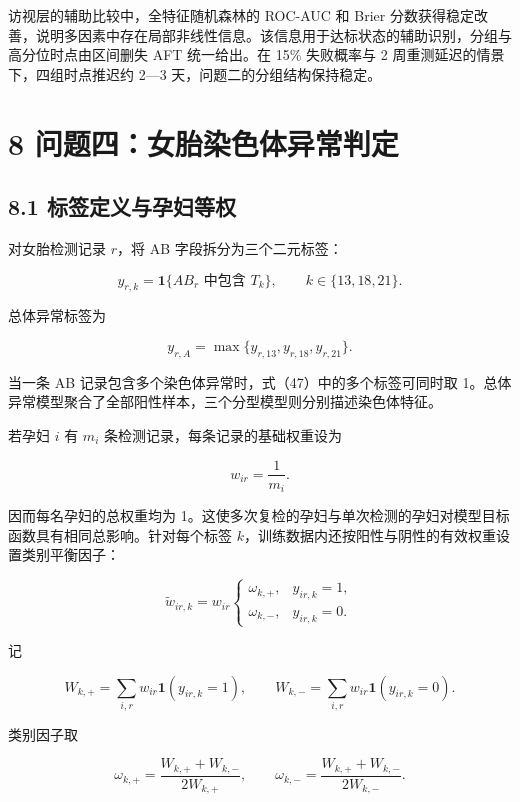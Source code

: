 \documentclass[UTF8,fontset=fandol,zihao=-4,a4paper]{ctexart}
\begin{document}
访视层的辅助比较中，全特征随机森林的 ROC-AUC 和 Brier
分数获得稳定改善，说明多因素中存在局部非线性信息。该信息用于达标状态的辅助识别，分组与高分位时点由区间删失
AFT 统一给出。在 15\% 失败概率与 2 周重测延迟的情景下，四组时点推迟约
2---3 天，问题二的分组结构保持稳定。

\FloatBarrier

\section{8
问题四：女胎染色体异常判定}\label{ux95eeux9898ux56dbux5973ux80ceux67d3ux8272ux4f53ux5f02ux5e38ux5224ux5b9a}

\subsection{8.1
标签定义与孕妇等权}\label{ux6807ux7b7eux5b9aux4e49ux4e0eux5b55ux5987ux7b49ux6743}

对女胎检测记录 \(r\)，将 AB 字段拆分为三个二元标签：

\[
y_{r,k}
=\mathbf1\{AB_r\text{ 中包含 }T_k\},
\qquad k\in\{13,18,21\}.
\tag{47}
\]

总体异常标签为

\[
y_{r,A}
=\max\{y_{r,13},y_{r,18},y_{r,21}\}.
\tag{48}
\]

当一条 AB 记录包含多个染色体异常时，式（47）中的多个标签可同时取
1。总体异常模型聚合了全部阳性样本，三个分型模型则分别描述染色体特征。

若孕妇 \(i\) 有 \(m_i\) 条检测记录，每条记录的基础权重设为

\[
w_{ir}=\frac{1}{m_i}.
\tag{49}
\]

因而每名孕妇的总权重均为
1。这使多次复检的孕妇与单次检测的孕妇对模型目标函数具有相同总影响。针对每个标签
\(k\)，训练数据内还按阳性与阴性的有效权重设置类别平衡因子：

\[
\widetilde w_{ir,k}
=w_{ir}
\begin{cases}
\omega_{k,+},&y_{ir,k}=1,\\
\omega_{k,-},&y_{ir,k}=0.
\end{cases}
\tag{50}
\]

记

\[
W_{k,+}=\sum_{i,r}w_{ir}\mathbf1(y_{ir,k}=1),
\qquad
W_{k,-}=\sum_{i,r}w_{ir}\mathbf1(y_{ir,k}=0).
\]

类别因子取

\[
\omega_{k,+}=\frac{W_{k,+}+W_{k,-}}{2W_{k,+}},
\qquad
\omega_{k,-}=\frac{W_{k,+}+W_{k,-}}{2W_{k,-}}.
\tag{50a}
\]
\end{document}
